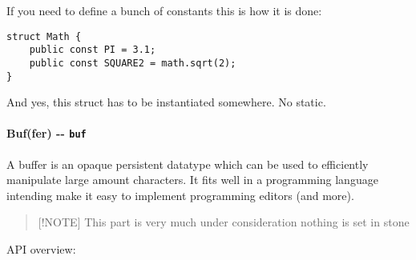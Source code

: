 If you need to define a bunch of constants this is how it is done:

\begin{verbatim}
struct Math {
    public const PI = 3.1;
    public const SQUARE2 = math.sqrt(2);
}
\end{verbatim}

And yes, this struct has to be instantiated somewhere. No static.

\hypertarget{buffer----buf}{%
\paragraph{\texorpdfstring{Buf(fer) -\/-
\texttt{buf}}{Buf(fer) -\/- buf}}\label{buffer----buf}}

A buffer is an opaque persistent datatype which can be used to
efficiently manipulate large amount characters. It fits well in a
programming language intending make it easy to implement programming
editors (and more).

\begin{quote}
{[}!NOTE{]} This part is very much under consideration nothing is set in
stone
\end{quote}

API overview:


